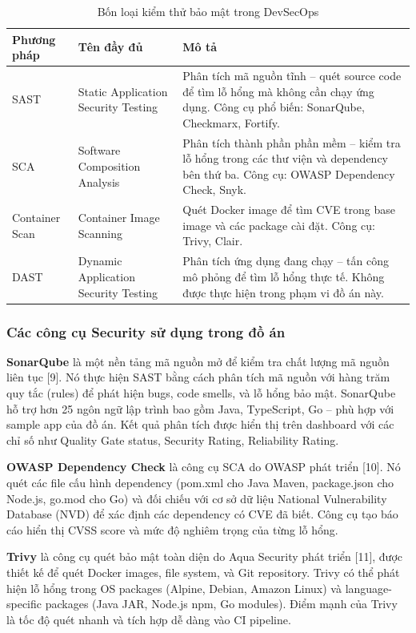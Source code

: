 \documentclass[13pt,a4paper,twoside]{extarticle}
\begin{document}
\begin{table}[H]
\centering
\begin{tabular}{@{}p{2.5cm} p{5cm} p{7.5cm}@{}}
\toprule
\textbf{Phương pháp} & \textbf{Tên đầy đủ} & \textbf{Mô tả} \\
\midrule
SAST & Static Application Security Testing & Phân tích mã nguồn tĩnh -- quét source code để tìm lỗ hổng mà không cần chạy ứng dụng. Công cụ phổ biến: SonarQube, Checkmarx, Fortify. \\
\midrule
SCA  & Software Composition Analysis & Phân tích thành phần phần mềm -- kiểm tra lỗ hổng trong các thư viện và dependency bên thứ ba. Công cụ: OWASP Dependency Check, Snyk. \\
\midrule
Container Scan & Container Image Scanning & Quét Docker image để tìm CVE trong base image và các package cài đặt. Công cụ: Trivy, Clair. \\
\midrule
DAST & Dynamic Application Security Testing & Phân tích ứng dụng đang chạy -- tấn công mô phỏng để tìm lỗ hổng thực tế. Không được thực hiện trong phạm vi đồ án này. \\
\bottomrule
\end{tabular}
\caption{Bốn loại kiểm thử bảo mật trong DevSecOps}
\label{tab:security-testing}
\end{table}

\subsubsection{Các công cụ Security sử dụng trong đồ án}

\textbf{SonarQube} là một nền tảng mã nguồn mở để kiểm tra chất lượng mã nguồn liên tục [9]. Nó thực hiện SAST bằng cách phân tích mã nguồn với hàng trăm quy tắc (rules) để phát hiện bugs, code smells, và lỗ hổng bảo mật. SonarQube hỗ trợ hơn 25 ngôn ngữ lập trình bao gồm Java, TypeScript, Go -- phù hợp với sample app của đồ án. Kết quả phân tích được hiển thị trên dashboard với các chỉ số như Quality Gate status, Security Rating, Reliability Rating.

\textbf{OWASP Dependency Check} là công cụ SCA do OWASP phát triển [10]. Nó quét các file cấu hình dependency (pom.xml cho Java Maven, package.json cho Node.js, go.mod cho Go) và đối chiếu với cơ sở dữ liệu National Vulnerability Database (NVD) để xác định các dependency có CVE đã biết. Công cụ tạo báo cáo hiển thị CVSS score và mức độ nghiêm trọng của từng lỗ hổng.

\textbf{Trivy} là công cụ quét bảo mật toàn diện do Aqua Security phát triển [11], được thiết kế để quét Docker images, file system, và Git repository. Trivy có thể phát hiện lỗ hổng trong OS packages (Alpine, Debian, Amazon Linux) và language-specific packages (Java JAR, Node.js npm, Go modules). Điểm mạnh của Trivy là tốc độ quét nhanh và tích hợp dễ dàng vào CI pipeline.
\end{document}
